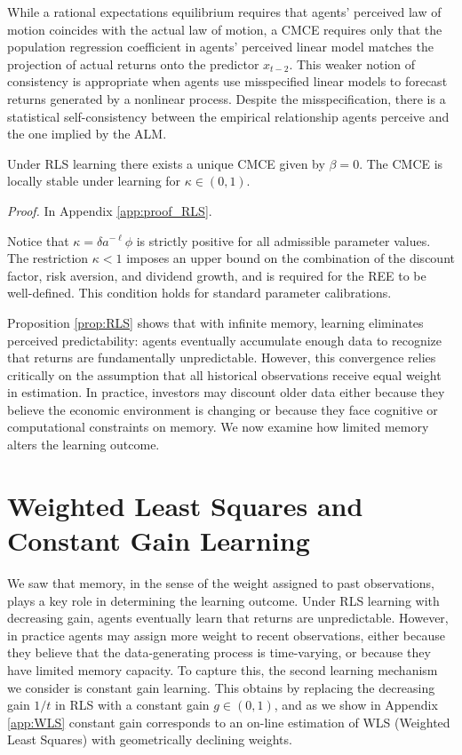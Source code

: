 \documentclass[11pt]{article}
\begin{document}
While a rational expectations equilibrium requires that agents' perceived law of motion coincides with the actual law of motion, a CMCE requires only that the population regression coefficient in agents' perceived linear model matches the projection of actual returns onto the predictor $x_{t-2}$. 
This weaker notion of consistency is appropriate when agents use misspecified linear models to forecast returns generated by a nonlinear process. Despite the misspecification, there is a statistical self-consistency between the empirical relationship agents perceive and the one implied by the ALM.

\begin{proposition}\label{prop:RLS}
    Under RLS learning there exists a unique CMCE given by $\beta = 0$. The CMCE is locally stable under learning for $\kappa \in (0,1)$.
\end{proposition}

\textit{Proof.} In Appendix \ref{app:proof_RLS}.

Notice that $\kappa = \delta a^{-\ell} \phi$ is strictly positive for all admissible parameter values. The restriction $\kappa < 1$ imposes an upper bound on the combination of the discount factor, risk aversion, and dividend growth, and is required for the REE to be well-defined. This condition holds for standard parameter calibrations.

Proposition \ref{prop:RLS} shows that with infinite memory, learning eliminates perceived predictability: agents eventually accumulate enough data to recognize that returns are fundamentally unpredictable.
However, this convergence relies critically on the assumption that all historical observations receive equal weight in estimation. 
In practice, investors may discount older data either because they believe the economic environment is changing or because they face cognitive or computational constraints on memory. 
We now examine how limited memory alters the learning outcome.




\section{Weighted Least Squares and Constant Gain Learning}\label{sec:w_ls}

We saw that memory, in the sense of the weight assigned to past observations, plays a key role in determining the learning outcome.
Under RLS learning with decreasing gain, agents eventually learn that returns are unpredictable.
However, in practice agents may assign more weight to recent observations, either because they believe that the data-generating process is time-varying, or because they have limited memory capacity.
To capture this, the second learning mechanism we consider is constant gain learning.
This obtains by replacing the decreasing gain $1/t$ in RLS with a constant gain $g \in (0,1)$, and as we show in Appendix \ref{app:WLS} constant gain corresponds to an on-line estimation of WLS (Weighted Least Squares) with geometrically declining weights.
\end{document}
